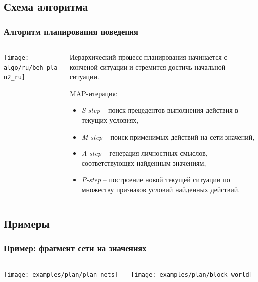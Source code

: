 \documentclass[default]{beamer}
\begin{document}
	\subsection{Схема алгоритма}
	\begin{frame}
		\frametitle{Алгоритм планирования поведения}
		
		\begin{columns}
			\begin{column}{0.6\textwidth}
				\texttt{[image: algo/ru/beh\_plan2\_ru]}
				\vspace{10pt}
				\nocite{*}
				\printbibliography[keyword={plan}, resetnumbers=true]
				\printbibliography[keyword={causnet}]
			\end{column}
			\begin{column}{0.4\textwidth}
				\scriptsize
				Иерархический процесс планирования начинается с конченой ситуации и стремится достичь начальной ситуации.
				\par\bigskip
				MAP-итерация:
				\begin{itemize}
					\item \textit{S-step} -- поиск прецедентов выполнения действия в текущих условиях,
					\item \textit{M-step} -- поиск применимых действий на сети значений,
					\item \textit{A-step} -- генерация личностных смыслов, соответствующих найденным значениям,
					\item \textit{P-step} -- построение новой текущей ситуации по множеству признаков условий найденных действий.
					
				\end{itemize}
			\end{column}
		\end{columns}
		
	\end{frame}		
	
	\subsection{Примеры}
	\begin{frame}
		\frametitle{Пример: фрагмент сети на значениях}
		\begin{columns}
			\begin{column}{0.7\textwidth}
				\centering
				\texttt{[image: examples/plan/plan\_nets]}
			\end{column}
			\begin{column}{0.3\textwidth}
				\centering
				\texttt{[image: examples/plan/block\_world]}
			\end{column}
		\end{columns}
	\end{frame}	
	
\end{document}
